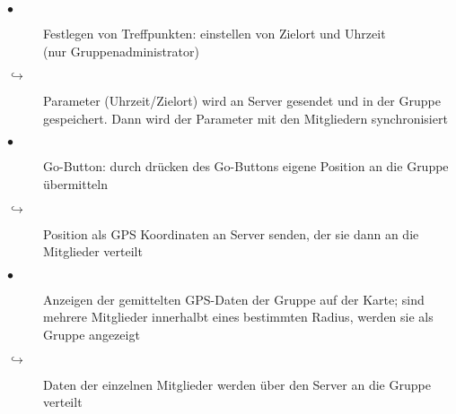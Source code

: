\begin{description}
\item[$\bullet$] Festlegen von Treffpunkten: einstellen von Zielort und Uhrzeit\\(nur Gruppenadministrator)
\item[$\hookrightarrow$] Parameter (Uhrzeit/Zielort) wird an Server gesendet und in der Gruppe gespeichert. Dann wird der Parameter mit den Mitgliedern synchronisiert
\item[$\bullet$] Go-Button: durch drücken des Go-Buttons eigene Position an die Gruppe übermitteln
\item[$\hookrightarrow$] Position als GPS Koordinaten an Server senden, der sie dann an die Mitglieder verteilt
\item[$\bullet$] Anzeigen der gemittelten GPS-Daten der Gruppe auf der Karte; sind mehrere Mitglieder innerhalbt eines bestimmten Radius,
     werden sie als Gruppe angezeigt
\item[$\hookrightarrow$] Daten der einzelnen Mitglieder werden über den Server an die Gruppe verteilt
\end{description}
